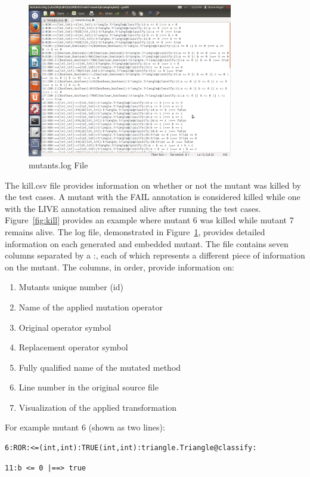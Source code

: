 \documentclass[12pt]{article}
\begin{document}
\begin{figure}[p]
\centering
\includegraphics[width=0.8\textwidth]{Lab7mutationslog.png}
\caption{mutants.log File}
\label{fig:mutants}
\end{figure}

The kill.csv file provides information on whether or not the mutant was killed by the test cases. A mutant with the FAIL annotation is considered killed while one with the LIVE annotation remained alive after running the test cases. Figure~\ref{fig:kill} provides an example where mutant 6 was killed while mutant 7 remains alive. The log file, demonstrated in Figure~\ref{fig:mutants}, provides detailed information on each generated and embedded mutant. The file contains seven columns separated by a :, each of which represents a different piece of information on the mutant. The columns, in order, provide information on:

\begin{enumerate}
\item{Mutants unique number (id)}
\item{Name of the applied mutation operator}
\item{Original operator symbol}
\item{Replacement operator symbol}
\item{Fully qualified name of the mutated method}
\item{Line number in the original source file}
\item{Visualization of the applied transformation}
\end{enumerate}

For example mutant 6 (shown as two lines):\\

\begin{small}
\begin{lstlisting}
6:ROR:<=(int,int):TRUE(int,int):triangle.Triangle@classify: 
\end{lstlisting}
\begin{lstlisting}
11:b <= 0 |==> true
\end{lstlisting}
\end{small}
\end{document}
